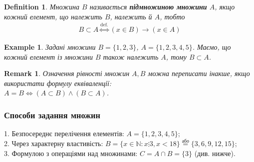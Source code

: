 \documentclass[a4paper, 14pt]{extarticle}
\theoremstyle{theoremdd}
\theoremstyle{theoremdd}
\newtheorem{definition}[theorem]{Definition}
\theoremstyle{theoremdd}
\theoremstyle{theoremdd}
\theoremstyle{theoremdd}
\newtheorem{example}[theorem]{Example}
\theoremstyle{theoremdd}
\theoremstyle{theoremdd}
\theoremstyle{theoremdd}
\theoremstyle{theoremdd}
\theoremstyle{theoremdd}
\theoremstyle{theoremdd}
\newtheorem{remark}[theorem]{Remark}
\theoremstyle{theoremdd}
\theoremstyle{theoremdd}
\theoremstyle{theoremdd}
\theoremstyle{theoremdd}
\begin{document}
\begin{definition}
Множина $B$ називається \textbf{підмножиною множини} $A$, якщо кожний елемент, що належить $B$, належить й $A$, тобто
\begin{align*}
B \subset A \overset{\text{def.}}{\iff} (x \in B) \rightarrow (x \in A)
\end{align*}
\end{definition}

\begin{example}
Задані множини $B = \{1,2,3\}$, $A = \{1,2,3,4,5\}$. Маємо, що кожний елемент із множини $B$ також належить $A$, тому $B \subset A$.
\end{example}

\begin{remark}
Означення рівності множин $A,B$ можна переписати інакше, якщо використати формулу еквіваленції: \\
$A=B \iff (A \subset B) \wedge (B \subset A)$.
\end{remark}

\subsubsection*{Способи задання множин}
1. Безпосереднє перелічення елементів: $A = \{1,2,3,4,5\}$;\\
2. Через характерну властивість: $B = \{ x \in \mathbb{N}: x \vdots 3, x < 18 \} \overset{\text{або}}{=} \{3,6,9,12,15\}$;\\
3. Формулою з операціями над множинами: $C = A \cap B = \{3\}$ (див. нижче).
\end{document}

